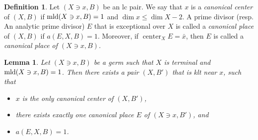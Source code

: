 \documentclass[11pt]{amsart}
\numberwithin{equation}{section}
\newcommand\han[1]{\todo[color=yellow!40]{#1}} %
\newcommand{\Center}{\operatorname{center}}
\newcommand{\mld}{{\rm{mld}}}
\newtheorem{lem}[thm]{Lemma}
\theoremstyle{definition}
\theoremstyle{definition}
\newtheorem{defn}[thm]{Definition}
\begin{document}
\begin{defn}\label{defn: canonical place}
Let $(X\ni x,B)$ be an lc pair. We say that $x$ is a \emph{canonical center} of $(X,B)$ if $\mld(X\ni x,B)=1$ and $\dim x\leq\dim X-2$. A prime divisor (resp. An analytic prime divisor) $E$ that is exceptional over $X$ is called a \emph{canonical place} of $(X,B)$ if $a(E,X,B)=1$. Moreover, if $\Center_X E=\bar{x}$, then $E$ is called a \emph{canonical place of $(X\ni x,B)$}.
\end{defn}

\begin{lem}\label{lem: tie breaking canonical pair}
Let $(X\ni x,B)$ be a germ such that $X$ is terminal and $\mld(X\ni x, B)=1$. Then there exists a pair $(X,B')$ that is klt near $x$, such that
\begin{itemize}
    \item $x$ is the only canonical center of $(X,B')$,
    \item there exists exactly one canonical place $E$ of $(X\ni x,B')$, and
    \item $a(E,X,B)=1$.
\end{itemize}
\end{lem}

\end{document}
